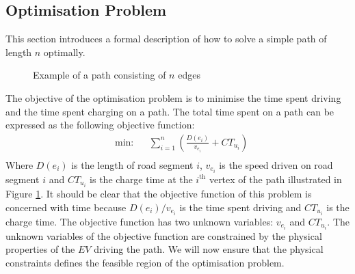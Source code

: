 \subsection{Optimisation Problem}\label{sec:optiprob}
This section introduces a formal description of how to solve a simple path of length $n$ optimally.

\begin{figure}[!htb]
\centering
    \caption{Example of a path consisting of $n$ edges} \label{fig:pathexample}
\end{figure}

The objective of the optimisation problem is to minimise the time spent driving and the time spent charging on a path. The total time spent on a path can be expressed as the following objective function:
\begin{equation*}
\begin{aligned} &
{\text{min:}}
& & \sum_{i=1}^{n} \left(\frac{D(e_i)}{v_{e_i}} + CT_{u_i} \right)\\
\end{aligned}
\end{equation*}
Where $D(e_i)$ is the length of road segment $i$, $v_{e_i}$ is the speed driven on road segment $i$ and $CT_{u_i}$ is the charge time at the $i^{\text{th}}$ vertex of the path illustrated in Figure \ref{fig:pathexample}. It should be clear that the objective function of this problem is concerned with time because \( D(e_i)/v_{e_i} \) is the time spent driving and $CT_{u_i}$ is the charge time. The objective function has two unknown variables: $v_{e_i}$ and $CT_{u_i}$. The unknown variables of the objective function are constrained by the physical properties of the $EV$ driving the path. We will now ensure that the physical constraints defines the feasible region of the optimisation problem.

